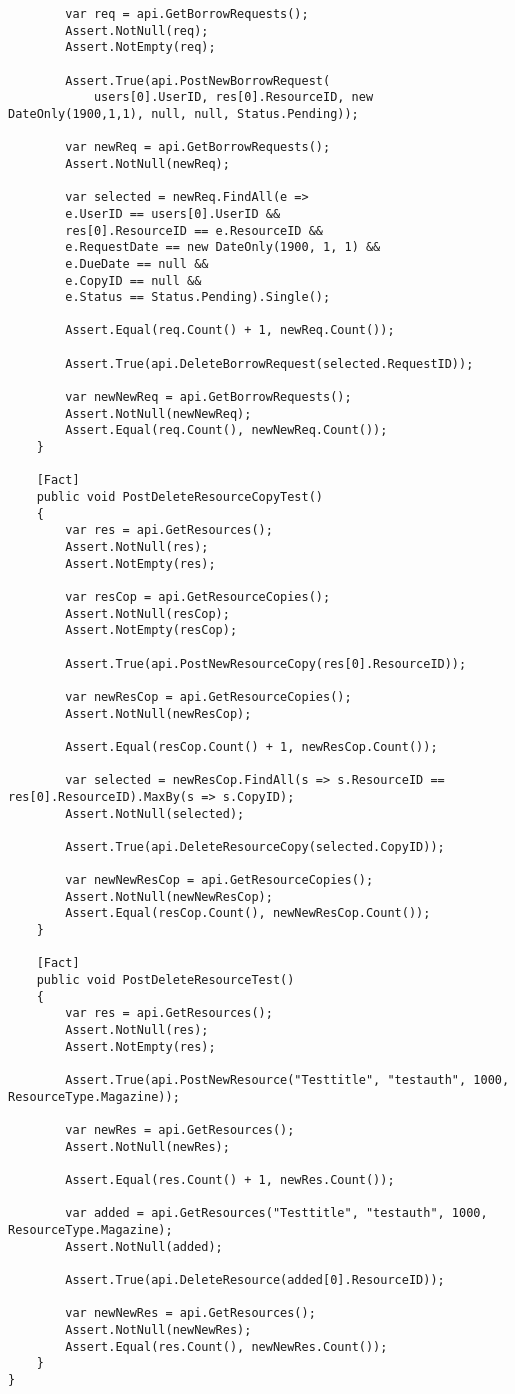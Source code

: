 \begin{verbatim}
        var req = api.GetBorrowRequests();
        Assert.NotNull(req);
        Assert.NotEmpty(req);

        Assert.True(api.PostNewBorrowRequest(
            users[0].UserID, res[0].ResourceID, new DateOnly(1900,1,1), null, null, Status.Pending));

        var newReq = api.GetBorrowRequests();
        Assert.NotNull(newReq);

        var selected = newReq.FindAll(e => 
        e.UserID == users[0].UserID && 
        res[0].ResourceID == e.ResourceID && 
        e.RequestDate == new DateOnly(1900, 1, 1) &&
        e.DueDate == null &&
        e.CopyID == null &&
        e.Status == Status.Pending).Single();

        Assert.Equal(req.Count() + 1, newReq.Count());

        Assert.True(api.DeleteBorrowRequest(selected.RequestID));

        var newNewReq = api.GetBorrowRequests();
        Assert.NotNull(newNewReq);
        Assert.Equal(req.Count(), newNewReq.Count());
    }
    
    [Fact]
    public void PostDeleteResourceCopyTest()
    {
        var res = api.GetResources();
        Assert.NotNull(res);
        Assert.NotEmpty(res);

        var resCop = api.GetResourceCopies();
        Assert.NotNull(resCop);
        Assert.NotEmpty(resCop);

        Assert.True(api.PostNewResourceCopy(res[0].ResourceID));

        var newResCop = api.GetResourceCopies();
        Assert.NotNull(newResCop);

        Assert.Equal(resCop.Count() + 1, newResCop.Count());

        var selected = newResCop.FindAll(s => s.ResourceID == res[0].ResourceID).MaxBy(s => s.CopyID);
        Assert.NotNull(selected);

        Assert.True(api.DeleteResourceCopy(selected.CopyID));

        var newNewResCop = api.GetResourceCopies();
        Assert.NotNull(newNewResCop);
        Assert.Equal(resCop.Count(), newNewResCop.Count());
    }

    [Fact]
    public void PostDeleteResourceTest()
    {
        var res = api.GetResources();
        Assert.NotNull(res);
        Assert.NotEmpty(res);

        Assert.True(api.PostNewResource("Testtitle", "testauth", 1000, ResourceType.Magazine));
        
        var newRes = api.GetResources();
        Assert.NotNull(newRes);

        Assert.Equal(res.Count() + 1, newRes.Count());

        var added = api.GetResources("Testtitle", "testauth", 1000, ResourceType.Magazine);
        Assert.NotNull(added);

        Assert.True(api.DeleteResource(added[0].ResourceID));

        var newNewRes = api.GetResources();
        Assert.NotNull(newNewRes);
        Assert.Equal(res.Count(), newNewRes.Count());
    }
}
\end{verbatim}
